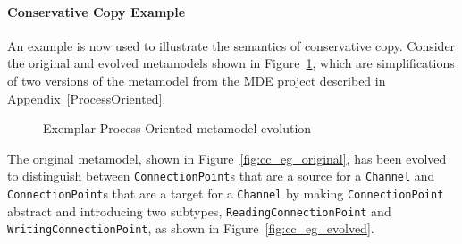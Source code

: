 \paragraph{Conservative Copy Example} An example is now used to illustrate the semantics of conservative copy. Consider the original and evolved metamodels shown in Figure~\ref{fig:cc_eg_mms}, which are simplifications of two versions of the metamodel from the MDE project described in Appendix~\ref{ProcessOriented}. 

\begin{figure}
	\centering
	\caption{Exemplar Process-Oriented metamodel evolution}
\label{fig:cc_eg_mms}
\end{figure}

The original metamodel, shown in Figure~\ref{fig:cc_eg_original}, has been evolved to distinguish between \texttt{Co\-nn\-ec\-ti\-o\-nP\-oi\-nt}s that are a source for a \texttt{Ch\-an\-n\-el} and \texttt{Co\-nn\-ec\-ti\-o\-nP\-oi\-nt}s that are a target for a \texttt{Ch\-an\-n\-el} by making \texttt{Co\-nn\-ec\-ti\-o\-nP\-oi\-nt} abstract and introducing two subtypes, \texttt{Re\-a\-di\-ngCo\-nn\-ec\-ti\-o\-nP\-oi\-nt} and \texttt{Wr\-i\-ti\-ngCo\-nn\-ec\-ti\-o\-nP\-oi\-nt}, as shown in Figure~\ref{fig:cc_eg_evolved}.

